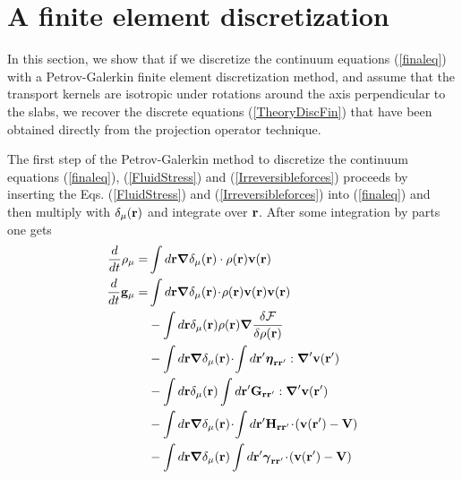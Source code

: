 \documentclass[b5paper,openright,11pt]{book}
\newcommand{\esc}{\!\cdot\!}
\begin{document}
\newpage
\section{A finite element discretization}
\label{Sec:Galerkin}
In this section, we show that if we discretize the continuum equations
(\ref{finaleq}) with  a Petrov-Galerkin finite  element discretization
method,  and assume  that the  transport kernels  are isotropic  under
rotations  around the axis  perpendicular  to the  slabs,  we recover  the
discrete equations (\ref{TheoryDiscFin}) that have been obtained directly
from the projection operator technique.

The  first  step  of  the Petrov-Galerkin  method  to  discretize  the
continuum  equations  (\ref{finaleq}),  (\ref{FluidStress}) and (\ref{Irreversibleforces})  proceeds  by
inserting the Eqs. (\ref{FluidStress}) and (\ref{Irreversibleforces}) into (\ref{finaleq}) and then multiply with
$\delta_\mu({\bf  r})$  and  integrate  over ${\bf  r}$.   After  some
integration by parts one gets
\begin{align}
\frac{d}{dt}\rho_\mu=&\int d{\bf r}\boldsymbol{\nabla}\delta_\mu({\bf r})\cdot\rho({\bf r}){\bf v}({\bf r})
\nonumber\\
\frac{d}{dt}{\bf g}_\mu=&\int d{\bf r}\boldsymbol{\nabla}\delta_\mu({\bf r})\esc\rho({\bf r}){\bf v}({\bf r}){\bf v}({\bf r})
\nonumber\\
&-\int d{\bf r}\delta_\mu({\bf r})\rho({\bf r})\boldsymbol{\nabla}\frac{\delta{\cal F}}{\delta\rho({\bf r})}
\nonumber\\
&-\int d{\bf r}\boldsymbol{\nabla}\delta_\mu({\bf r})\esc
\int d{\bf r}'\boldsymbol{\eta}_{{\bf r}{\bf r}'}:{\boldsymbol{\nabla}^\prime}{\bf v}({\bf r}')
\nonumber\\
&-\int d{\bf r}\delta_\mu({\bf r})\int d{\bf r}'{\bf G}_{{\bf r}{\bf r}'}:
{\boldsymbol{\nabla}^\prime} {\bf v}({\bf r}')
\nonumber\\
&-\int d{\bf r}\boldsymbol{\nabla}\delta_\mu({\bf r})\esc \int d{\bf r}'{\bf H}_{{\bf r}{\bf r}'}
\esc ( {\bf v}({\bf r}')-{\bf V})
\nonumber\\
&-\int d{\bf r}\boldsymbol{\nabla}\delta_\mu({\bf r})\int d{\bf r}'
\boldsymbol{\gamma}_{{\bf r}{\bf r}'}\esc( {\bf v}({\bf r}')
-{\bf V})
\label{fulldelta}
\end{align}
\end{document}
